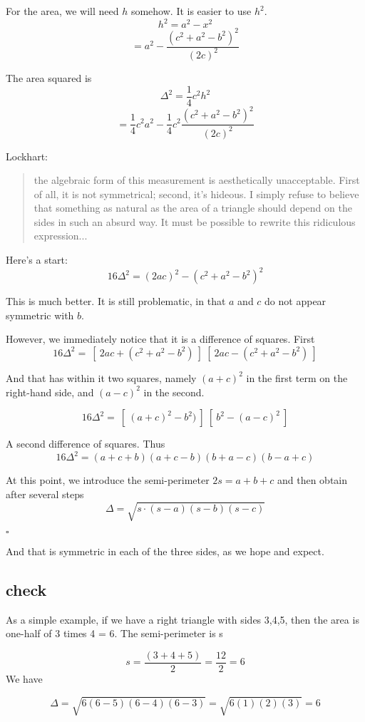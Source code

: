 \documentclass[11pt, oneside]{article}
\begin{document}
For the area, we will need $h$ somehow.  It is easier to use $h^2$.
\[ h^2 = a^2 - x^2 \]
\[ = a^2 - \frac{(c^2 + a^2-b^2)^2}{(2c)^2}  \]

The area squared is
\[ \Delta^2 = \frac{1}{4}c^2 h^2 \]
\[ = \frac{1}{4} c^2 a^2 - \frac{1}{4} c^2 \frac{(c^2 + a^2-b^2)^2}{(2c)^2}  \]

Lockhart:

\begin{quote}
the algebraic form of this measurement is aesthetically unacceptable. First of all, it is not symmetrical; second, it's hideous. I simply refuse to believe that something as natural as the area of a triangle should depend on the sides in such an absurd way. It must be possible to rewrite this ridiculous expression...
\end{quote}

Here's a start:
\[ 16 \Delta^2 = (2ac)^2 - (c^2 + a^2-b^2)^2 \]

This is much better.  It is still problematic, in that $a$ and $c$ do not appear symmetric with $b$.

However, we immediately notice that it is a difference of squares.  First
\[ 16 \Delta^2 = \ [ \ 2ac + (c^2 + a^2-b^2) \ ] \ [ \ 2ac - (c^2 + a^2-b^2) \ ]  \]

And that has within it two squares, namely $(a + c)^2$ in the first term on the right-hand side, and $(a - c)^2$ in the second.

\[ 16 \Delta^2 = \ [ \ (a + c)^2 -b^2) \ ] \ [ \ b^2 - (a - c)^2 \ ]  \]

A second difference of squares.  Thus
\[ 16 \Delta^2 =  (a + c + b)(a + c - b)(b + a - c)(b - a + c) \]

At this point, we introduce the semi-perimeter $2s = a + b + c$ and then obtain after several steps
\[ \Delta = \sqrt{s \cdot (s - a)(s - b)(s - c)} \]

$\square$

And that is symmetric in each of the three sides, as we hope and expect.

\subsection*{check}
As a simple example, if we have a right triangle with sides 3,4,5, then the area is one-half of 3 times 4 = 6.  The semi-perimeter is s

\[ s = \frac{(3 + 4 + 5)}{2} = \frac{12}{2} = 6 \]
We have

\[ \Delta =  \sqrt { 6 (6-5) (6-4) (6-3) } =  \sqrt { 6 (1) (2) (3) } = 6 \]
\end{document}
